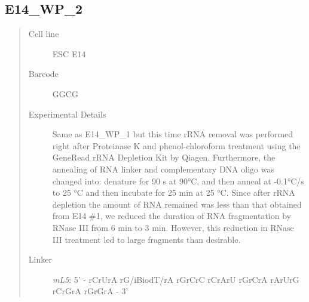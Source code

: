 \documentclass[letterpaper,10pt,english]{sphinxmanual}
\begin{document}
\subsection{E14\_WP\_2}
\label{Data_Resources:e14-wp-2}\begin{quote}\begin{description}
\item[{Cell line}] \leavevmode
ESC E14

\item[{Barcode}] \leavevmode
GGCG

\item[{Experimental Details}] \leavevmode
Same as E14\_WP\_1 but this time rRNA removal was performed right after
Proteinase K and phenol-chloroform treatment using the GeneRead rRNA Depletion Kit by
Qiagen. Furthermore, the annealing of RNA linker and complementary DNA oligo was changed
into: denature for 90 s at 90°C, and then anneal at -0.1°C/s to 25 °C and then incubate
for 25 min at 25 °C. Since after rRNA depletion the amount of RNA remained was less than
that obtained from E14 \#1, we reduced the duration of RNA fragmentation by RNase III from
6 min to 3 min. However, this reduction in RNase III treatment led to large fragments than
desirable.

\item[{Linker}] \leavevmode
\emph{mL5}: 5' - rCrUrA rG/iBiodT/rA rGrCrC rCrArU rGrCrA rArUrG rCrGrA rGrGrA - 3'

\end{description}\end{quote}
\end{document}
